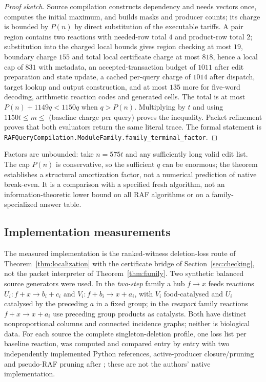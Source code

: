 \documentclass[11pt,a4paper]{article}
\theoremstyle{plain}
\theoremstyle{definition}
\theoremstyle{remark}
\newcommand{\lean}[1]{\texttt{#1}}
\begin{document}
\begin{proof}[Proof sketch]
Source compilation constructs dependency and needs vectors once, computes the initial maximum, and builds masks and producer counts; its charge is bounded by $P(n)$ by direct substitution of the executable tariffs. A pair region contains two reactions with needed-row total $4$ and product-row total $2$; substitution into the charged local bounds gives region checking at most $19$, boundary charge $155$ and total local certificate charge at most $818$, hence a local cap of $831$ with metadata, an accepted-transaction budget of $1011$ after edit preparation and state update, a cached per-query charge of $1014$ after dispatch, target lookup and output construction, and at most $135$ more for five-word decoding, arithmetic reaction codes and generated cells. The total is at most $P(n)+1149q<1150q$ when $q>P(n)$. Multiplying by $t$ and using $1150t\le m\le$ (baseline charge per query) proves the inequality. Packet refinement proves that both evaluators return the same literal trace. The formal statement is \lean{RAFQueryCompilation.ModuleFamily.family\_terminal\_factor}.
\end{proof}

Factors are unbounded: take $n=575t$ and any sufficiently long valid edit list. The cap $P(n)$ is conservative, so the sufficient $q$ can be enormous; the theorem establishes a structural amortization factor, not a numerical prediction of native break-even. It is a comparison with a specified fresh algorithm, not an information-theoretic lower bound on all RAF algorithms or on a family-specialized answer table.

\subsection{Implementation measurements}\label{sec:localization-impl}

The measured implementation is the ranked-witness deletion-loss route of Theorem~\ref{thm:localization} with the certificate bridge of Section~\ref{sec:checking}, not the packet interpreter of Theorem~\ref{thm:family}. Two synthetic balanced source generators were used. In the \emph{two-step} family a hub $f\to x$ feeds reactions $U_i:f+x\to b_i+c_i$ and $V_i:f+b_i\to x+a_i$, with $V_i$ food-catalysed and $U_i$ catalysed by the preceding $a$ in a fixed group; in the \emph{reexport} family reactions $f+x\to x+a_i$ use preceding group products as catalysts. Both have distinct nonproportional columns and connected incidence graphs; neither is biological data. For each source the complete singleton-deletion profile, one loss list per baseline reaction, was computed and compared entry by entry with two independently implemented Python references, active-producer closure/pruning and pseudo-RAF pruning after \citep{hordijk2015}; these are not the authors' native implementation.
\end{document}
